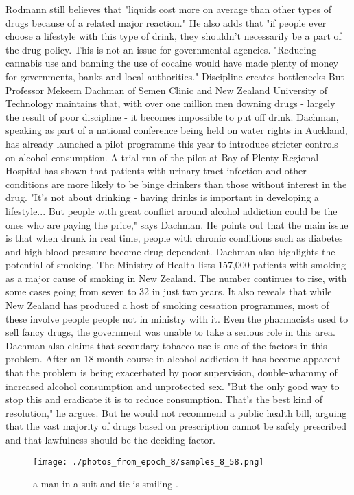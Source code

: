 \documentclass{article}%
\begin{document}
Rodmann still believes that "liquids cost more on average than other types of drugs because of a related major reaction."\newline%
He also adds that "if people ever choose a lifestyle with this type of drink, they shouldn't necessarily be a part of the drug policy. This is not an issue for governmental agencies.\newline%
"Reducing cannabis use and banning the use of cocaine would have made plenty of money for governments, banks and local authorities."\newline%
Discipline creates bottlenecks\newline%
But Professor Mekeem Dachman of Semen Clinic and New Zealand University of Technology maintains that, with over one million men downing drugs {-} largely the result of poor discipline {-} it becomes impossible to put off drink.\newline%
Dachman, speaking as part of a national conference being held on water rights in Auckland, has already launched a pilot programme this year to introduce stricter controls on alcohol consumption.\newline%
A trial run of the pilot at Bay of Plenty Regional Hospital has shown that patients with urinary tract infection and other conditions are more likely to be binge drinkers than those without interest in the drug.\newline%
"It's not about drinking {-} having drinks is important in developing a lifestyle... But people with great conflict around alcohol addiction could be the ones who are paying the price," says Dachman.\newline%
He points out that the main issue is that when drunk in real time, people with chronic conditions such as diabetes and high blood pressure become drug{-}dependent.\newline%
Dachman also highlights the potential of smoking. The Ministry of Health lists 157,000 patients with smoking as a major cause of smoking in New Zealand. The number continues to rise, with some cases going from seven to 32 in just two years.\newline%
It also reveals that while New Zealand has produced a host of smoking cessation programmes, most of these involve people people not in ministry with it.\newline%
Even the pharmacists used to sell fancy drugs, the government was unable to take a serious role in this area.\newline%
Dachman also claims that secondary tobacco use is one of the factors in this problem. After an 18 month course in alcohol addiction it has become apparent that the problem is being exacerbated by poor supervision, double{-}whammy of increased alcohol consumption and unprotected sex.\newline%
"But the only good way to stop this and eradicate it is to reduce consumption. That's the best kind of resolution," he argues.\newline%
But he would not recommend a public health bill, arguing that the vast majority of drugs based on prescription cannot be safely prescribed and that lawfulness should be the deciding factor.\newline%

%


\begin{figure}[h!]%
\centering%
\texttt{[image: ./photos\_from\_epoch\_8/samples\_8\_58.png]}%
\caption{a man in a suit and tie is smiling .}%
\end{figure}

%
\end{document}
